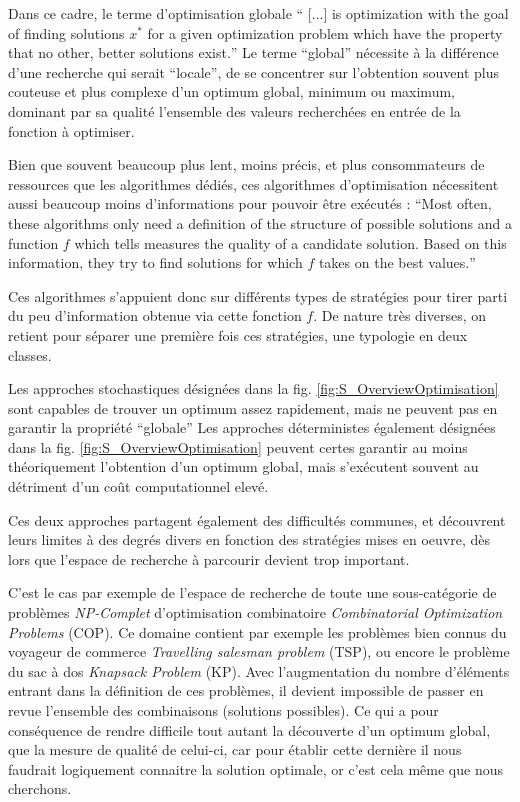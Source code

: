 Dans ce cadre, le terme d'optimisation globale \foreignquote{english}{ [...] is optimization with the goal of finding solutions $x^*$ for a given optimization problem which have the property that no other, better solutions exist.} Le terme \enquote{global} nécessite à la différence d'une recherche qui serait \enquote{locale}, de se concentrer sur l'obtention souvent plus couteuse et plus complexe d'un optimum global, minimum ou maximum, dominant par sa qualité l'ensemble des valeurs recherchées en entrée de la fonction à optimiser.

Bien que souvent beaucoup plus lent, moins précis, et plus consommateurs de ressources que les algorithmes dédiés, ces algorithmes d'optimisation nécessitent aussi beaucoup moins d'informations pour pouvoir être exécutés : \foreignquote{english}{Most often, these algorithms only need a definition of the structure of possible solutions and a function $f$ which tells measures the quality of a candidate solution. Based on this information, they try to find solutions for which $f$ takes on the best values.} \autocite[24]{Weise2011}

Ces algorithmes s'appuient donc sur différents types de stratégies pour tirer parti du peu d'information obtenue via cette fonction $f$. De nature très diverses, on retient pour séparer une première fois ces stratégies, une typologie en deux classes.

\begin{itemize}[label=\textbullet]
 Les approches stochastiques désignées dans la fig. \ref{fig:S_OverviewOptimisation} sont capables de trouver un optimum assez rapidement, mais ne peuvent pas en garantir la propriété \enquote{globale}
 Les approches déterministes également désignées dans la fig. \ref{fig:S_OverviewOptimisation} peuvent certes garantir au moins théoriquement l'obtention d'un optimum global, mais s'exécutent souvent au détriment d'un coût computationnel elevé.
\end{itemize}

Ces deux approches partagent également des difficultés communes, et découvrent leurs limites à des degrés divers en fonction des stratégies mises en oeuvre, dès lors que l'espace de recherche à parcourir devient trop important.

C'est le cas par exemple de l'espace de recherche de toute une sous-catégorie de problèmes \textit{NP-Complet} d'optimisation combinatoire \textit{Combinatorial Optimization Problems} (COP). Ce domaine contient par exemple les problèmes bien connus du voyageur de commerce \textit{Travelling salesman problem} (TSP), ou encore le problème du sac à dos \textit{Knapsack Problem} (KP). Avec l'augmentation du nombre d'éléments entrant dans la définition de ces problèmes, il devient impossible de passer en revue l'ensemble des combinaisons (solutions possibles). Ce qui a pour conséquence de rendre difficile tout autant la découverte d'un optimum global, que la mesure de qualité de celui-ci, car pour établir cette dernière il nous faudrait logiquement connaitre la solution optimale, or c'est cela même que nous cherchons.

